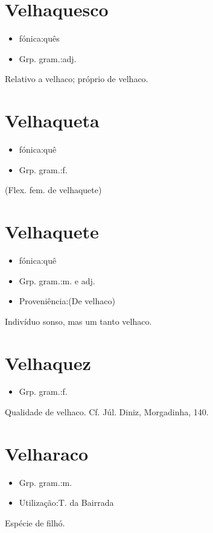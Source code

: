 \documentclass{article}
\begin{document}
\section{Velhaquesco}
\begin{itemize}
\item {fónica:quês}
\end{itemize}
\begin{itemize}
\item {Grp. gram.:adj.}
\end{itemize}
Relativo a velhaco; próprio de velhaco.
\section{Velhaqueta}
\begin{itemize}
\item {fónica:quê}
\end{itemize}
\begin{itemize}
\item {Grp. gram.:f.}
\end{itemize}
(Flex. fem. de \textunderscore velhaquete\textunderscore )
\section{Velhaquete}
\begin{itemize}
\item {fónica:quê}
\end{itemize}
\begin{itemize}
\item {Grp. gram.:m.  e  adj.}
\end{itemize}
\begin{itemize}
\item {Proveniência:(De \textunderscore velhaco\textunderscore )}
\end{itemize}
Indivíduo sonso, mas um tanto velhaco.
\section{Velhaquez}
\begin{itemize}
\item {Grp. gram.:f.}
\end{itemize}
Qualidade de velhaco. Cf. Júl. Diniz, \textunderscore Morgadinha\textunderscore , 140.
\section{Velharaco}
\begin{itemize}
\item {Grp. gram.:m.}
\end{itemize}
\begin{itemize}
\item {Utilização:T. da Bairrada}
\end{itemize}
Espécie de filhó.
\end{document}
